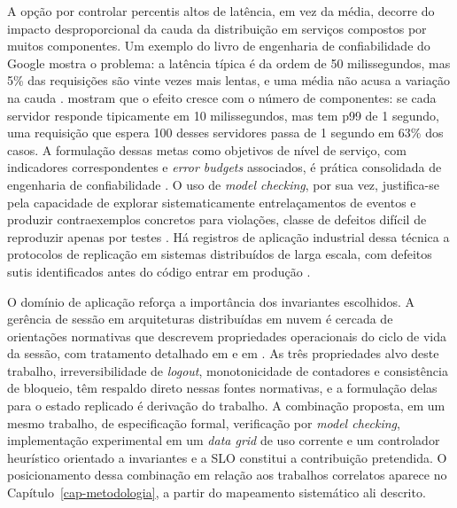 A opção por controlar percentis altos de latência, em vez da média, decorre do impacto desproporcional da cauda da distribuição em serviços compostos por muitos componentes. Um exemplo do livro de engenharia de confiabilidade do Google mostra o problema: a latência típica é da ordem de 50 milissegundos, mas 5\% das requisições são vinte vezes mais lentas, e uma média não acusa a variação na cauda \citep{google_sre_slo}. \citet{dean_barroso_tail_2013} mostram que o efeito cresce com o número de componentes: se cada servidor responde tipicamente em 10 milissegundos, mas tem p99 de 1 segundo, uma requisição que espera 100 desses servidores passa de 1 segundo em 63\% dos casos. A formulação dessas metas como objetivos de nível de serviço, com indicadores correspondentes e \emph{error budgets} associados, é prática consolidada de engenharia de confiabilidade \citep{google_sre_slo}. O uso de \emph{model checking}, por sua vez, justifica-se pela capacidade de explorar sistematicamente entrelaçamentos de eventos e produzir contraexemplos concretos para violações, classe de defeitos difícil de reproduzir apenas por testes \citep{newcombe_aws_formal_methods_2015}. Há registros de aplicação industrial dessa técnica a protocolos de replicação em sistemas distribuídos de larga escala, com defeitos sutis identificados antes do código entrar em produção \citep{newcombe_aws_tla_2014, newcombe_aws_formal_methods_2015}.

O domínio de aplicação reforça a importância dos invariantes escolhidos. A gerência de sessão em arquiteturas distribuídas em nuvem é cercada de orientações normativas que descrevem propriedades operacionais do ciclo de vida da sessão, com tratamento detalhado em \citet{nist_sp_800_63b4_2025} e em \citet{owasp_session_mgmt_cheatsheet}. As três propriedades alvo deste trabalho, irreversibilidade de \emph{logout}, monotonicidade de contadores e consistência de bloqueio, têm respaldo direto nessas fontes normativas, e a formulação delas para o estado replicado é derivação do trabalho. A combinação proposta, em um mesmo trabalho, de especificação formal, verificação por \emph{model checking}, implementação experimental em um \emph{data grid} de uso corrente e um controlador heurístico orientado a invariantes e a SLO constitui a contribuição pretendida. O posicionamento dessa combinação em relação aos trabalhos correlatos aparece no Capítulo~\ref{cap-metodologia}, a partir do mapeamento sistemático ali descrito.


